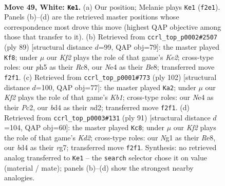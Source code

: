 \documentclass[11pt]{article}
\begin{document}
\clearpage

\begin{figure}[p]\centering
\begin{subfigure}{0.46\textwidth}\centering
\resizebox{\linewidth}{!}{%
\newchessgame
\chessboard[
  setfen={4kr2/7r/4n3/3R1nPp/P2bN3/5R2/5KP1/6N1 w - - 7 49},
  showmover=false,
  pgfstyle=straightmove, color=movearrow, markmove={f2-e1}
]}
\caption{}
\end{subfigure}\hfill
\begin{subfigure}{0.46\textwidth}\centering
\resizebox{\linewidth}{!}{%
\newchessgame
\chessboard[
  setfen={2r1b3/4k2R/3rp3/1p6/1PnN1n2/P7/4B3/B2RK3 b - - 1 45},
  showmover=false,
  pgfstyle=straightmove, color=movearrow, markmove={e7-f8}
]}
\caption{}
\end{subfigure}
\\[4pt]
\begin{subfigure}{0.46\textwidth}\centering
\resizebox{\linewidth}{!}{%
\newchessgame
\chessboard[
  setfen={7k/7p/8/r5b1/N2Rp3/8/1PPn4/1K4R1 w - - 1 52},
  showmover=false,
  pgfstyle=straightmove, color=movearrow, markmove={b1-a2}
]}
\caption{}
\end{subfigure}\hfill
\begin{subfigure}{0.46\textwidth}\centering
\resizebox{\linewidth}{!}{%
\newchessgame
\chessboard[
  setfen={4r3/1p1k2R1/2n5/pN6/6R1/1P6/1P1rPK2/8 b - - 6 46},
  showmover=false,
  pgfstyle=straightmove, color=movearrow, markmove={d7-c8}
]}
\caption{}
\end{subfigure}
\caption{\textbf{Move 49, White: \texttt{Ke1}.} (a) Our position; Melanie plays \texttt{Ke1} (\texttt{f2e1}). Panels (b)--(d) are the retrieved master positions whose correspondence most drove this move (highest QAP objective among those that transfer to it). (b) Retrieved from \texttt{ccrl\_top\_p0002\#2507} (ply 89) [structural distance $d$=99, QAP obj=79]: the master played \texttt{Kf8}; under $\mu$ our \emph{Kf2} plays the role of that game's \emph{Ke2}; cross-type roles: our \emph{p}h5 as their \emph{R}c8, our \emph{N}e4 as their \emph{B}e8; transferred move \texttt{f2f1}. (c) Retrieved from \texttt{ccrl\_top\_p0001\#773} (ply 102) [structural distance $d$=100, QAP obj=77]: the master played \texttt{Ka2}; under $\mu$ our \emph{Kf2} plays the role of that game's \emph{Kb1}; cross-type roles: our \emph{N}e4 as their \emph{P}c2, our \emph{b}d4 as their \emph{n}d2; transferred move \texttt{f2f1}. (d) Retrieved from \texttt{ccrl\_top\_p0003\#131} (ply 91) [structural distance $d$=104, QAP obj=60]: the master played \texttt{Kc8}; under $\mu$ our \emph{Kf2} plays the role of that game's \emph{Kd2}; cross-type roles: our \emph{N}g1 as their \emph{R}e8, our \emph{b}d4 as their \emph{r}g7; transferred move \texttt{f2f1}. Synthesis: no retrieved analog transferred to \texttt{Ke1} -- the \texttt{search} selector chose it on value (material / mate); panels (b)--(d) show the strongest nearby analogies.}
\label{fig:thought-m96}
\end{figure}
\end{document}
